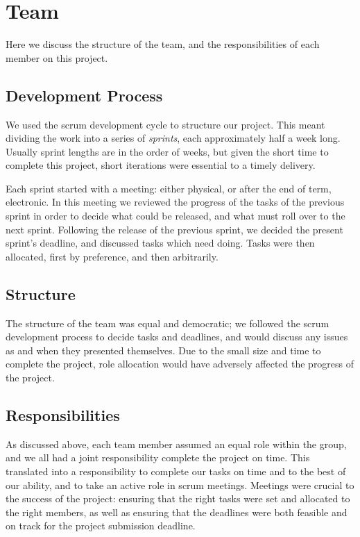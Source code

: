 \section{Team}

Here we discuss the structure of the team, and the responsibilities of each member on this project.

\subsection{Development Process}

We used the scrum development cycle to structure our project.
This meant dividing the work into a series of \emph{sprints}, each approximately half a week long.
Usually sprint lengths are in the order of weeks, but given the short time to complete this project, short iterations were essential to a timely delivery.

Each sprint started with a meeting: either physical, or after the end of term, electronic.
In this meeting we reviewed the progress of the tasks of the previous sprint in order to decide what could be released, and what must roll over to the next sprint.
Following the release of the previous sprint, we decided the present sprint's deadline, and discussed tasks which need doing.
Tasks were then allocated, first by preference, and then arbitrarily.

\subsection{Structure}

The structure of the team was equal and democratic; we followed the scrum development process to decide tasks and deadlines, and would discuss any issues as and when they presented themselves.
Due to the small size and time to complete the project, role allocation would have adversely affected the progress of the project.

\subsection{Responsibilities}

As discussed above, each team member assumed an equal role within the group, and we all had a joint responsibility complete the project on time.
This translated into a responsibility to complete our tasks on time and to the best of our ability, and to take an active role in scrum meetings.
Meetings were crucial to the success of the project: ensuring that the right tasks were set and allocated to the right members, as well as ensuring that the deadlines were both feasible and on track for the project submission deadline.
